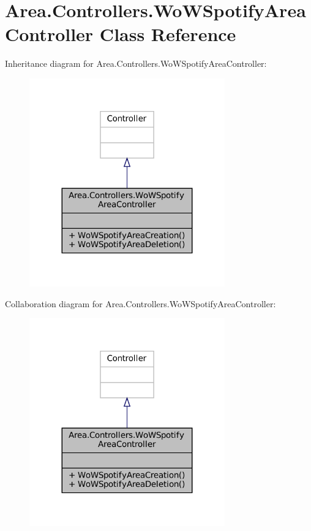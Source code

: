\hypertarget{classArea_1_1Controllers_1_1WoWSpotifyAreaController}{}\section{Area.\+Controllers.\+Wo\+W\+Spotify\+Area\+Controller Class Reference}
\label{classArea_1_1Controllers_1_1WoWSpotifyAreaController}


Inheritance diagram for Area.\+Controllers.\+Wo\+W\+Spotify\+Area\+Controller\+:
\nopagebreak
\begin{figure}[H]
\begin{center}
\leavevmode
\includegraphics[width=239pt]{classArea_1_1Controllers_1_1WoWSpotifyAreaController__inherit__graph}
\end{center}
\end{figure}


Collaboration diagram for Area.\+Controllers.\+Wo\+W\+Spotify\+Area\+Controller\+:
\nopagebreak
\begin{figure}[H]
\begin{center}
\leavevmode
\includegraphics[width=239pt]{classArea_1_1Controllers_1_1WoWSpotifyAreaController__coll__graph}
\end{center}
\end{figure}
